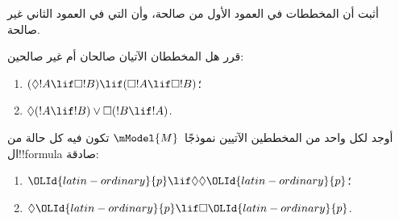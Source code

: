 \documentclass[../../../include/open-logic-section]{subfiles}
\begin{document}
\begin{prob}%
  أثبت أن المخططات في العمود الأول من
   صالحة، وأن التي في
  العمود الثاني غير صالحة.
\end{prob}

\begin{prob}
  قرر هل المخططان الآتيان صالحان أم غير صالحين:
  \begin{enumerate}
  \item $(\Diamond !A \lif \Box !B) \lif (\Box !A \lif \Box
    !B)$؛
  \item $\Diamond(!A \lif !B) \lor \Box(!B \lif !A)$.
  \end{enumerate}
\end{prob}

\begin{prob}
  أوجد لكل واحد من المخططين الآتيين نموذجًا~$\mModel{M}$ تكون فيه كل
  حالة من ال!!{formula} صادقة:
  \begin{enumerate}
  \item ${\OLId{latin-ordinary}{p}} \lif \Diamond\Diamond {\OLId{latin-ordinary}{p}}$؛
  \item $\Diamond {\OLId{latin-ordinary}{p}} \lif \Box {\OLId{latin-ordinary}{p}}$.
  \end{enumerate}
\end{prob}
\end{document}
